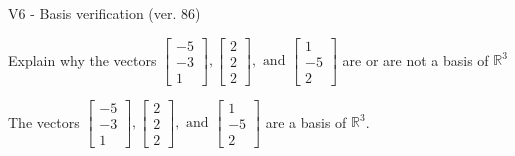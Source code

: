 \begin{exercise}
  \begin{exerciseTitle}V6 - Basis verification (ver. 86)\end{exerciseTitle}
  \begin{exerciseStatement}
    Explain why the vectors \(\left[\begin{array}{r}
-5 \\
-3 \\
1
\end{array}\right] , \left[\begin{array}{r}
2 \\
2 \\
2
\end{array}\right] , \text{ and } \left[\begin{array}{r}
1 \\
-5 \\
2
\end{array}\right]\) are or are not a basis of \(\mathbb{R}^3\)	


  \end{exerciseStatement}
  \begin{exerciseAnswer}
   The vectors \(\left[\begin{array}{r}
-5 \\
-3 \\
1
\end{array}\right] , \left[\begin{array}{r}
2 \\
2 \\
2
\end{array}\right] , \text{ and } \left[\begin{array}{r}
1 \\
-5 \\
2
\end{array}\right]\) 
  	 are  a basis of \(\mathbb{R}^3\).
  


  \end{exerciseAnswer}
\end{exercise}